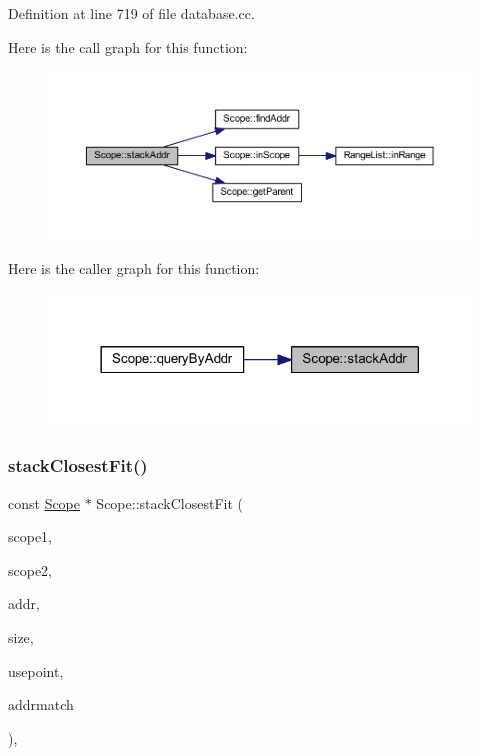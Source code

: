 Definition at line 719 of file database.\+cc.

Here is the call graph for this function\+:
\nopagebreak
\begin{figure}[H]
\begin{center}
\leavevmode
\includegraphics[width=350pt]{class_scope_a598536926659c304d35346aba6d79fa2_cgraph}
\end{center}
\end{figure}
Here is the caller graph for this function\+:
\nopagebreak
\begin{figure}[H]
\begin{center}
\leavevmode
\includegraphics[width=318pt]{class_scope_a598536926659c304d35346aba6d79fa2_icgraph}
\end{center}
\end{figure}
\mbox{\label{class_scope_a4de9b51d8c57e33e9394512489539664}} 
\subsubsection{\texorpdfstring{stackClosestFit()}{stackClosestFit()}}
{\footnotesize\ttfamily const \mbox{\hyperlink{class_scope}{Scope}} $\ast$ Scope\+::stack\+Closest\+Fit (\begin{DoxyParamCaption}\item[{const \mbox{\hyperlink{class_scope}{Scope}} $\ast$}]{scope1,  }\item[{const \mbox{\hyperlink{class_scope}{Scope}} $\ast$}]{scope2,  }\item[{const \mbox{\hyperlink{class_address}{Address}} \&}]{addr,  }\item[{int4}]{size,  }\item[{const \mbox{\hyperlink{class_address}{Address}} \&}]{usepoint,  }\item[{\mbox{\hyperlink{class_symbol_entry}{Symbol\+Entry}} $\ast$$\ast$}]{addrmatch }\end{DoxyParamCaption})\hspace{0.3cm}{\ttfamily [static]}, {\ttfamily [protected]}}

